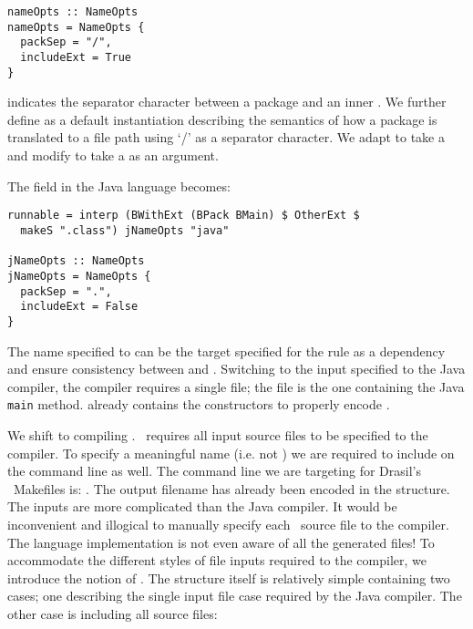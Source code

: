 {{{{{\begin{tcolorbox}
\begin{verbatim}
nameOpts :: NameOpts
nameOpts = NameOpts {
  packSep = "/",
  includeExt = True
}
\end{verbatim}
\end{tcolorbox}

 indicates the separator character between a package and an inner . We further define  as a default instantiation describing the semantics of how a package is translated to a file path using `/' as a separator character. We adapt  to take a  and modify  to take a  as an argument.

%

The  field in the Java language  becomes:

\begin{tcolorbox}
\begin{verbatim}
runnable = interp (BWithExt (BPack BMain) $ OtherExt $
  makeS ".class") jNameOpts "java"

jNameOpts :: NameOpts
jNameOpts = NameOpts {
  packSep = ".",
  includeExt = False
}
\end{verbatim}
\end{tcolorbox}

The name specified to  can be the target specified for the  rule as a dependency and ensure consistency between  and . Switching to the input specified to the Java compiler, the compiler requires a single file; the file is the one containing the Java \texttt{main} method.  already contains the constructors to properly encode . 

We shift to compiling \CC. \CC~requires all input source files to be specified to the compiler. To specify a meaningful name (i.e. not ) we are required to include  on the command line as well. The command line we are targeting for Drasil's \CC~Makefiles is: . The output filename has already been encoded in the  structure. The inputs are more complicated than the Java compiler. It would be inconvenient and illogical to manually specify each \CC~source file to the compiler. The language implementation is not even aware of all the generated files! To accommodate the different styles of file inputs required to the compiler, we introduce the notion of . The structure itself is relatively simple containing two cases; one describing the single input file case required by the Java compiler. The other case is including all source files:

}}}}}
